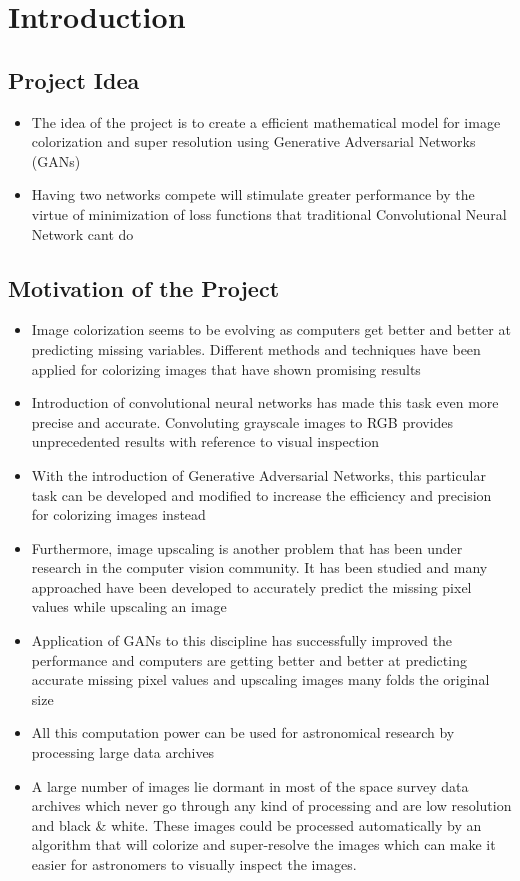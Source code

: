 \documentclass[oneside,a4paper,12pt]{report}
\begin{document}
\setlength{\parindent}{11mm}





\chapter{Introduction}
\section{Project Idea}
\begin{itemize}
\item The idea of the project is to create a efficient mathematical model for image colorization and super resolution using Generative Adversarial Networks (GANs)
\item Having two networks compete will stimulate greater performance by the virtue of minimization of loss functions that traditional Convolutional Neural Network cant do
\end{itemize}


\section{Motivation of the Project}
\begin{itemize}
\item Image colorization seems to be evolving as computers get better and better at predicting missing variables. Different methods and techniques have been applied for colorizing images that have shown promising results
\item Introduction of convolutional neural networks has made this task even more precise and accurate. Convoluting grayscale images to RGB provides unprecedented results with reference to visual inspection
\item With the introduction of Generative Adversarial Networks, this particular task can be developed and modified to increase the efficiency and precision for colorizing images instead
\item Furthermore, image upscaling is another problem that has been under research in the computer vision community. It has been studied and many approached have been developed to accurately predict the missing pixel values while upscaling an image
\item Application of GANs to this discipline has successfully improved the performance and computers are getting better and better at predicting accurate missing pixel values and upscaling images many folds the original size
\item All this computation power can be used for astronomical research by processing large data archives
\item A large number of images lie dormant in most of the space survey data archives which never go through any kind of processing and are low resolution and black \& white. These images could be processed automatically by an algorithm that will colorize and super-resolve the images which can make it easier for astronomers to visually inspect the images.
\end{itemize}
\end{document}
